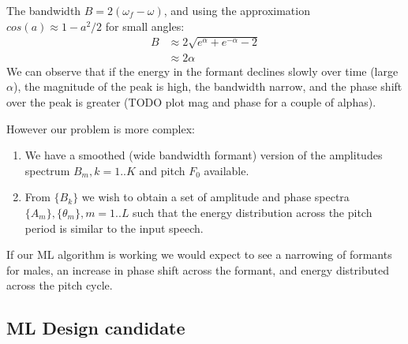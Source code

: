 \documentclass{article}
\begin{document}
The bandwidth $B=2(\omega_f - \omega)$, and using the approximation $cos(a) \approx 1-a^2/2$ for small angles:
\begin{equation}
\begin{split}
B &\approx 2\sqrt{e^\alpha+e^{-\alpha}-2} \\
  &\approx 2\alpha
\end{split}
\end{equation}
We can observe that if the energy in the formant declines slowly over time (large $\alpha$), the magnitude of the peak is high, the bandwidth narrow, and the phase shift over the peak is greater (TODO plot mag and phase for a couple of alphas).
	
However our problem is more complex:
\begin{enumerate}
\item We have a smoothed (wide bandwidth formant) version of the amplitudes spectrum $B_m,k=1..K$ and pitch $F_0$ available.
\item From $\{B_k\}$ we wish to obtain a set of amplitude and phase spectra $\{A_m\}, \{\theta_m\},m=1..L$ such that the energy distribution across the pitch period is similar to the input speech.
\end{enumerate}
If our ML algorithm is working we would expect to see a narrowing of formants for males, an increase in phase shift across the formant, and energy distributed across the pitch cycle.

\subsection{ML Design candidate}
\end{document}
